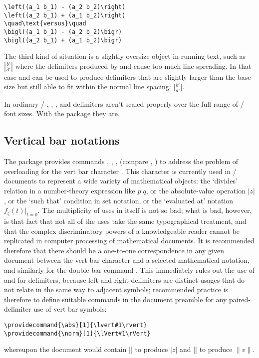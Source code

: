 \documentclass[leqno,titlepage,openany]{amsldoc}[1999/12/13]
\begin{document}
\begin{verbatim}
\left((a_1 b_1) - (a_2 b_2)\right)
\left((a_2 b_1) + (a_1 b_2)\right)
\quad\text{versus}\quad
\bigl((a_1 b_1) - (a_2 b_2)\bigr)
\bigl((a_2 b_1) + (a_1 b_2)\bigr)
\end{verbatim}
The third kind of situation is a slightly oversize object in running
text, such as $\left\lvert\frac{b'}{d'}\right\rvert$ where the
delimiters produced by  and  cause too much line
spreading. In that case  and  can be used to produce
delimiters that are slightly larger than the base size but still able to
fit within the normal line spacing:
$\bigl\lvert\frac{b'}{d'}\bigr\rvert$.

In ordinary \latex/ , , , and 
delimiters aren't scaled properly over the full range of \latex/ font
sizes.  With the  package they are.

\subsection{Vertical bar notations}

The  package provides commands , ,
,  (compare , ) to address the
problem of overloading for the vert bar character \qc{\|}. This
character is currently used in \latex/ documents to represent a wide
variety of mathematical objects: the `divides' relation in a
number-theory expression like $p\vert q$, or the absolute-value
operation $\lvert z\rvert$, or the `such that' condition in set
notation, or the `evaluated at' notation $f_\zeta(t)\bigr\rvert_{t=0}$.
The multiplicity of uses in itself is not so bad; what is bad, however,
is that fact that not all of the uses take the same typographical
treatment, and that the complex discriminatory powers of a knowledgeable
reader cannot be replicated in computer processing of mathematical
documents. It is recommended therefore that there should be a one-to-one
correspondence in any given document between the vert bar character
\qc{\|} and a selected mathematical notation, and similarly for the
double-bar command \ncn{\|}. This immediately
rules out the use of \qc{|}
and \ncn{\|} for delimiters, because left and right
delimiters are distinct usages that do not relate in the same way to
adjacent symbols; recommended practice is therefore to define suitable
commands in the document preamble for any paired-delimiter use of vert
bar symbols:
\begin{verbatim}
\providecommand{\abs}[1]{\lvert#1\rvert}
\providecommand{\norm}[1]{\lVert#1\rVert}
\end{verbatim}
whereupon the document would contain || to produce $\lvert
z\rvert$ and || to produce $\lVert v\rVert$.
\end{document}
